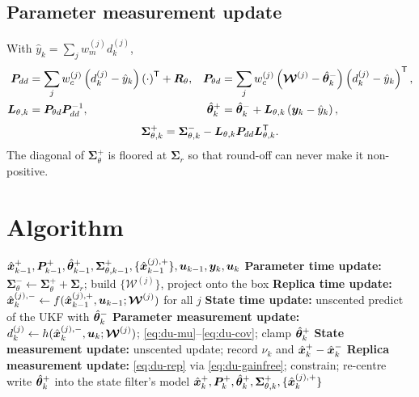 \subsection{Parameter measurement update}
With $\hat{y}_k=\sum_j w^{(j)}_m d^{(j)}_k$,
\begin{align}
\bm{P}_{dd}&=\sum_j w^{(j)}_c\left(d^{(j)}_k-\hat{y}_k\right)\left(\cdot\right)^{\mathsf{T}}+\bm{R}_\theta, &
\bm{P}_{\theta d}&=\sum_j w^{(j)}_c\left(\bm{\mathcal{W}}^{(j)}-\hat{\bm{\theta}}^-_k\right)\left(d^{(j)}_k-\hat{y}_k\right)^{\mathsf{T}},
\label{eq:du-mu}\\
\bm{L}_{\theta,k}&=\bm{P}_{\theta d}\bm{P}_{dd}^{-1}, &
\hat{\bm{\theta}}^+_k&=\hat{\bm{\theta}}^-_k+\bm{L}_{\theta,k}\left(\bm{y}_k-\hat{y}_k\right),
\label{eq:du-upd}
\end{align}
\begin{equation}
\bm{\Sigma}^+_{\theta,k}=\bm{\Sigma}^-_{\theta,k}-\bm{L}_{\theta,k}\bm{P}_{dd}\bm{L}_{\theta,k}^{\mathsf{T}} .
\label{eq:du-cov}
\end{equation}
The diagonal of $\bm{\Sigma}^+_\theta$ is floored at $\bm{\Sigma}_r$ so that round-off can never
make it non-positive.

\section{Algorithm}
\begin{algorithm}[H]
\caption{Dual SPKF --- one sampling period}
\begin{algorithmic}[1]
\Require $\hat{\bm{x}}^{+}_{k-1},\bm{P}^+_{k-1},\hat{\bm{\theta}}^+_{k-1},\bm{\Sigma}^+_{\theta,k-1},\{\hat{\bm{x}}^{(j),+}_{k-1}\},\bm{u}_{k-1},\bm{y}_k,\bm{u}_k$
\State \textbf{Parameter time update:} $\bm{\Sigma}^-_\theta\gets\bm{\Sigma}^+_\theta+\bm{\Sigma}_r$; build $\{\bm{\mathcal{W}}^{(j)}\}$, project onto the box
\State \textbf{Replica time update:} $\hat{\bm{x}}^{(j),-}_k\gets f(\hat{\bm{x}}^{(j),+}_{k-1},\bm{u}_{k-1};\bm{\mathcal{W}}^{(j)})$ for all $j$
\State \textbf{State time update:} unscented predict of the UKF with $\hat{\bm{\theta}}^-_k$
\State \textbf{Parameter measurement update:} $d^{(j)}_k\gets h(\hat{\bm{x}}^{(j),-}_k,\bm{u}_k;\bm{\mathcal{W}}^{(j)})$; \eqref{eq:du-mu}--\eqref{eq:du-cov}; clamp $\hat{\bm{\theta}}^+_k$
\State \textbf{State measurement update:} unscented update; record $\nu_k$ and $\hat{\bm{x}}^{+}_k-\hat{\bm{x}}^{-}_k$
\State \textbf{Replica measurement update:} \eqref{eq:du-rep} via \eqref{eq:du-gainfree}; constrain; re-centre
\State write $\hat{\bm{\theta}}^+_k$ into the state filter's model
\Ensure $\hat{\bm{x}}^{+}_k,\bm{P}^+_k,\hat{\bm{\theta}}^+_k,\bm{\Sigma}^+_{\theta,k},\{\hat{\bm{x}}^{(j),+}_k\}$
\end{algorithmic}
\end{algorithm}


